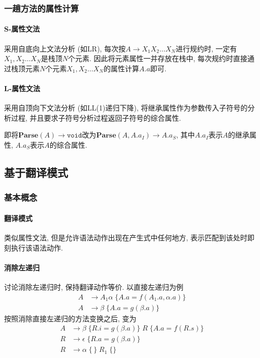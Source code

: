\documentclass{ctexart}
\begin{document}
\subsubsection{一趟方法的属性计算}
\paragraph{S-属性文法} 采用自底向上文法分析 (如LR), 每次按$A \to X_1 X_2 \ldots X_N$进行规约时, 一定有$X_1, X_2 \ldots X_N$是栈顶$N$个元素.
    因此将元素属性一并存放在栈中, 每次规约时直接通过栈顶元素$N$个元素$X_1, X_2\ldots X_N$的属性计算$A.a$即可.
\paragraph{L-属性文法} \label{onepass-l-attr-grammar} 采用自顶向下文法分析 (如LL(1)递归下降),
    将继承属性作为参数传入子符号的分析过程, 并且要求子符号分析过程返回子符号的综合属性.\par
    即将$\mathbf{Parse}(A) \to \mathtt{void}$改为$\mathbf{Parse}(A, A.a_I) \to A.a_S$, 其中$A.a_I$表示$A$的继承属性, $A.a_S$表示$A$的综合属性.

\subsection{基于翻译模式}
\subsubsection{基本概念}
\paragraph{翻译模式} 类似属性文法, 但是允许语法动作出现在产生式中任何地方, 表示匹配到该处时即刻执行该语法动作.
\paragraph{消除左递归} 讨论消除左递归时, 保持翻译动作等价. 以直接左递归为例\begin{align*}
        A & \to A_1 \alpha \; \{A.a = f(A_1.a, \alpha.a)\}\\
        A & \to \beta  \; \{A.a = g(\beta.a)\}
    \end{align*}
    按照消除直接左递归的方法变换之后, 变为 \begin{align*}
        A & \to \beta \; \{ R.i = g(\beta.a) \} \; R \; \{A.a = f(R.s)\}\\
        R & \to \epsilon  \; \{R.a = g(\beta.a)\}\\
        R & \to \alpha \; \{\,\}\; R_1  \; \{\}
    \end{align*}
\end{document}
